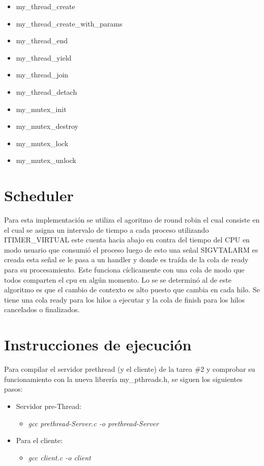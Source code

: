 \documentclass{article}
\begin{document}
\begin{itemize}
  \item my\_thread\_create
  \item my\_thread\_create\_with\_params
  \item my\_thread\_end
  \item my\_thread\_yield
  \item my\_thread\_join
  \item my\_thread\_detach
  \item my\_mutex\_init
  \item my\_mutex\_destroy
  \item my\_mutex\_lock
  \item my\_mutex\_unlock
\end{itemize}

\section{Scheduler}

Para esta implementación se utiliza el agoritmo de round robin el cual consiste en el cual se asigna un intervalo de tiempo a cada proceso utilizando ITIMER\_VIRTUAL este cuenta hacia abajo en contra del tiempo del CPU en modo usuario  que consumió el proceso luego de esto una señal SIGVTALARM es creada esta señal se le pasa a un handler y donde es traída de la cola de ready para su procesamiento. Este funciona cíclicamente con una cola de modo que todos comparten el cpu en algún momento. Lo se se determinó al de este algoritmo es que el cambio de contexto es alto puesto que cambia en cada hilo. Se tiene una cola ready para los hilos a ejecutar y la cola de finish para los hilos cancelados o finalizados. 
 

\section{Instrucciones de ejecuci\'on}
Para compilar el servidor prethread (y el cliente) de la tarea \#2 y comprobar su funcionamiento con la nueva librer\'ia my\_pthreads.h, se siguen los siguientes pasos:
\begin{itemize}
  \item Servidor pre-Thread:
  \begin{itemize}
    \item \emph{gcc prethread-Server.c -o prethread-Server}
  \end{itemize}
  \item Para el cliente:
  \begin{itemize}
    \item \emph{gcc client.c -o client}
  \end{itemize}
\end{itemize}
\end{document}
